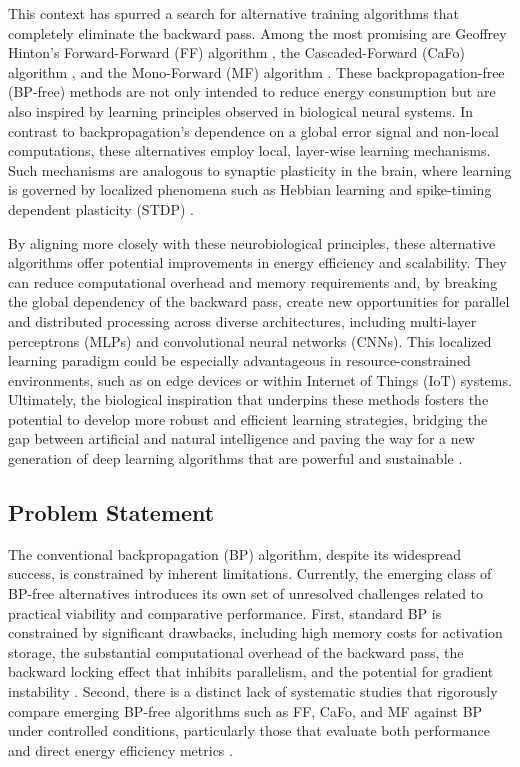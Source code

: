 This context has spurred a search for alternative training algorithms that completely eliminate the backward pass. Among the most promising are Geoffrey Hinton's Forward-Forward (FF) algorithm \cite{hinton2022forward}, the Cascaded-Forward (CaFo) algorithm \cite{zhao2023cafo}, and the Mono-Forward (MF) algorithm \cite{gong2025mono}. These backpropagation-free (BP-free) methods are not only intended to reduce energy consumption but are also inspired by learning principles observed in biological neural systems. In contrast to backpropagation's dependence on a global error signal and non-local computations, these alternatives employ local, layer-wise learning mechanisms. Such mechanisms are analogous to synaptic plasticity in the brain, where learning is governed by localized phenomena such as Hebbian learning \cite{song2000competitive} and spike-timing dependent plasticity (STDP) \cite{bi1998synaptic}.

By aligning more closely with these neurobiological principles, these alternative algorithms offer potential improvements in energy efficiency and scalability. They can reduce computational overhead and memory requirements and, by breaking the global dependency of the backward pass, create new opportunities for parallel and distributed processing across diverse architectures, including multi-layer perceptrons (MLPs) and convolutional neural networks (CNNs). This localized learning paradigm could be especially advantageous in resource-constrained environments, such as on edge devices or within Internet of Things (IoT) systems. Ultimately, the biological inspiration that underpins these methods fosters the potential to develop more robust and efficient learning strategies, bridging the gap between artificial and natural intelligence and paving the way for a new generation of deep learning algorithms that are powerful and sustainable \cite{bengio2015towards, lillicrap2020backpropagation}.

\subsection{Problem Statement}
\label{sec:problem}

The conventional backpropagation (BP) algorithm, despite its widespread success, is constrained by inherent limitations. Currently, the emerging class of BP-free alternatives introduces its own set of unresolved challenges related to practical viability and comparative performance. First, standard BP is constrained by significant drawbacks, including high memory costs for activation storage, the substantial computational overhead of the backward pass, the backward locking effect that inhibits parallelism, and the potential for gradient instability \cite{bengio2015towards, lillicrap2020backpropagation, jaderberg2017decoupled, hochreiter2001gradient}. Second, there is a distinct lack of systematic studies that rigorously compare emerging BP-free algorithms such as FF, CaFo, and MF against BP under controlled conditions, particularly those that evaluate both performance and direct energy efficiency metrics \cite{johnson2023inconsistency, strubell2019energy}.

